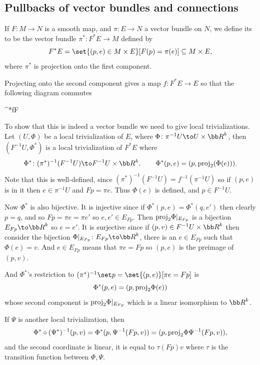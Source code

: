 \subsection{Pullbacks of vector bundles and connections}

\bdefn

    If $F\colon M\to N$ is a smooth map, and $\pi\colon E\to N$ a vector bundle on $N$, we define its 
    to be the vector bundle $\pi^*\colon F^*E\to M$ defined by
    $$ F^*E = \set{(p,e)\in M\times E}[F(p)=\pi(e)] \subseteq M\times E , $$
    where $\pi^*$ is projection onto the first component.

\edefn

Projecting onto the second component gives a map $f\colon F^*E\to E$ so that the following diagram commutes

    {\pi^*}{\pi}{f}{F}

To show that this is indeed a vector bundle we need to give local trivializations.
Let $(U,\Phi)$ be a local trivialization of $E$, where $\Phi\colon\pi^{-1}U\to U\times\bR^k$, then $(F^{-1}U,\Phi^*)$ is a local trivialization of $F^*E$ where
$$ \Phi^*\colon(\pi^*)^{-1}(F^{-1}U) \to F^{-1}U\times\bR^k,\qquad \Phi^*(p,e) = (p,\proj_2(\Phi(e))) . $$
Note that this is well-defined, since $(\pi^*)^{-1}(F^{-1}U)=f^{-1}(\pi^{-1}U)$ so if $(p,e)$ is in it then $e\in\pi^{-1}U$ and $Fp=\pi e$.
Thus $\Phi(e)$ is defined, and $p\in F^{-1}U$.

Now $\Phi^*$ is also bijective.
It is injective since if $\Phi^*(p,e)=\Phi^*(q,e')$ then clearly $p=q$, and so $Fp=\pi e=\pi e'$ so $e,e'\in E_{Fp}$.
Then ${\rm proj}_2\Phi|_{E_{Fp}}$ is a bijection $E_{Fp}\to\bR^k$ so $e=e'$.
It is surjective since if $(p,v)\in F^{-1}U\times\bR^k$ then consider the bijection $\Phi|_{E_{Fp}}\colon E_{Fp}\to\bR^k$, there is an $e\in E_{Fp}$ such that
$\Phi(e)=v$.
And $e\in E_{Fp}$ means that $\pi e=Fp$ so $(p,e)$ is the preimage of $(p,v)$.

And $\Phi^*$'s restriction to $(\pi^*)^{-1}\set p=\set{(p,e)}[\pi e=Fp]$ is
$$ \Phi^*(p,e) = (p,{\rm proj}_2\Phi(e)) $$
whose second component is ${\rm proj}_2\Phi|_{E_{Fp}}$ which is a linear isomorphism to $\bR^k$.

If $\Psi$ is another local trivialization, then
$$ \Phi^*\circ(\Psi^*)^{-1}(p,v) = \Phi^*(p,\Psi^{-1}(Fp,v)) = (p,{\rm proj}_2\Phi\Psi^{-1}(Fp,v)) , $$
and the second coordinate is linear, it is equal to $\tau(Fp)v$ where $\tau$ is the transition function between $\Phi,\Psi$.

